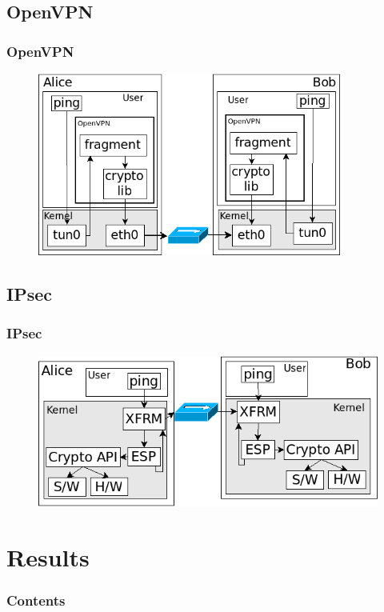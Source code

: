 \documentclass[xcolor={x11names, rgb, usenames, dvipsnames}]{beamer}
\begin{document}
\subsection{OpenVPN}
\begin{frame}
\frametitle{OpenVPN}
	\begin{figure}
	\includegraphics[height=6cm]{openvpn-transfer.png}
	\end{figure}
\end{frame}

\subsection{IPsec}
\begin{frame}
\frametitle{IPsec}
	\begin{figure}
	\includegraphics[height=5cm]{ipsec-transfer.png}
	\end{figure}
\end{frame}




\section{Results}
\begin{frame}
\frametitle{Contents}
\tableofcontents[%
	currentsection,
	sectionstyle=show/shaded,
	subsectionstyle=show/show/hide,
	]
\end{frame}
\end{document}
